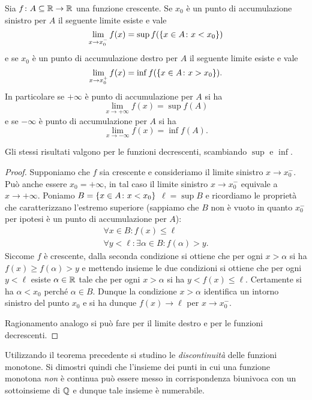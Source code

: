\begin{theorem}
  \mark{**}%
  \label{th:limite_monotona}%
Sia $f\colon A \subseteq \mathbb R \to \mathbb R$ una funzione crescente. 
Se $x_0$ è un punto di accumulazione sinistro per $A$ 
il seguente limite esiste e vale
\[
   \lim_{x\to x_0^-}f(x) = \sup f({\left\{ x\in A\colon x<x_0 \right\}})
\]
e se $x_0$ è un punto di accumulazione destro per $A$ 
il seguente limite esiste e vale
\[
   \lim_{x\to x_0^+} f(x) = \inf f({\left\{ x\in A\colon x>x_0 \right\}}).
\]
In particolare se $+\infty$ è punto di accumulazione per $A$ 
si ha 
\[
  \lim_{x\to +\infty} f(x) = \sup f(A)
\]
e se $-\infty$ è punto di accumulazione per $A$ si ha 
\[
  \lim_{x\to -\infty} f(x) = \inf f(A).
\]

Gli stessi risultati valgono per le funzioni decrescenti, 
scambiando $\sup$ e $\inf$.
\end{theorem}
%
\begin{proof}
Supponiamo che $f$ sia crescente e consideriamo il limite 
sinistro $x\to x_0^-$. Può anche essere $x_0=+\infty$, in tal 
caso il limite sinistro $x\to x_0^-$ equivale a $x\to +\infty$.
Poniamo $B={\left\{ x\in A\colon x<x_0 \right\}}$
$\ell=\sup B$ e ricordiamo le proprietà che caratterizzano 
l'estremo superiore
(sappiamo che $B$ non è vuoto in quanto $x_0^-$ per ipotesi 
è un punto di accumulazione per $A$):
\begin{gather*}
  \forall x \in B \colon f(x) \le \ell \\
  \forall y < \ell \colon \exists \alpha \in B \colon f(\alpha) > y.
\end{gather*}
Siccome $f$ è crescente, dalla seconda condizione 
si ottiene che per ogni $x>\alpha$ si ha $f(x)\ge f(\alpha)> y$
e mettendo insieme le due condizioni si ottiene che per ogni $y<\ell$
esiste $\alpha\in\mathbb R$ tale che per ogni $x>\alpha$ si ha $y<f(x)\le \ell$.
Certamente si ha $\alpha < x_0$ perché $\alpha\in B$.   
Dunque la condizione $x>\alpha$ identifica un intorno sinistro 
del punto $x_0$ e si ha dunque $f(x)\to \ell$ per $x\to x_0^-$.

Ragionamento analogo si può fare per il limite destro  
e per le funzioni decrescenti.
\end{proof}

\begin{exercise}
  Utilizzando il teorema precedente si studino le \emph{discontinuità}
  delle funzioni monotone. 
  Si dimostri quindi che l'insieme dei punti in cui una funzione monotona 
  \emph{non} è continua può essere messo in corrispondenza biunivoca 
  con un sottoinsieme di $\mathbb Q$ e dunque tale insieme è numerabile.
\end{exercise}

